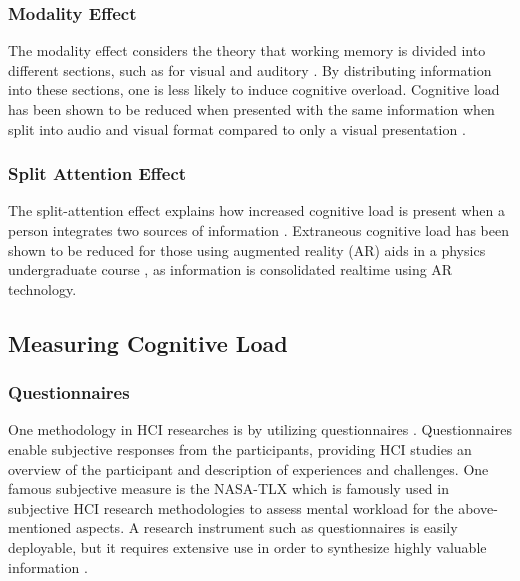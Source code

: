 \subsubsection{Modality Effect}
The modality effect considers the theory that working memory is divided into different sections, such as for visual and auditory \cite{sweller2019cognitive, sweller2011cognitive}. By distributing information into these sections, one is less likely to induce cognitive overload. Cognitive load has been shown to be reduced when presented with the same information when split into audio and visual format compared to only a visual presentation \cite{sweller2011cognitive}.

\subsubsection{Split Attention Effect}
The split-attention effect explains how increased cognitive load is present when a person integrates two sources of information \cite{sweller2019cognitive}. Extraneous cognitive load has been shown to be reduced for those using augmented reality (AR) aids in a physics undergraduate course \cite{klepsch2022}, as information is consolidated realtime using AR technology. 

\subsection{Measuring Cognitive Load}
\subsubsection{Questionnaires}
One methodology in HCI researches is by utilizing questionnaires \cite{hall2024, castanheira2021, ayres2021}. Questionnaires enable subjective responses from the participants, providing HCI studies an overview of the participant and description of experiences and challenges. One famous subjective measure is the NASA-TLX \cite{hall2024, ayres2021} which is famously used in subjective HCI research methodologies to assess mental workload for the above-mentioned aspects. A research instrument such as questionnaires is easily deployable, but it requires extensive use in order to synthesize highly valuable information \cite{castanheira2021}.

